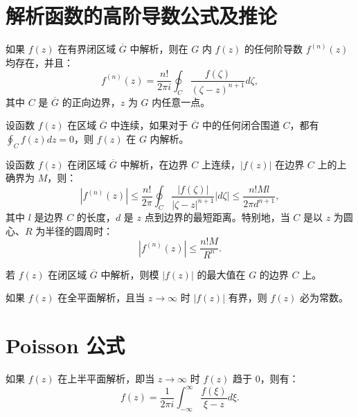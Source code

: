 \section{解析函数的高阶导数公式及推论}

\begin{theorem}[解析函数的高阶导数公式]
如果 \(f(z)\) 在有界闭区域 \(\overline{G}\) 中解析，则在 \(G\) 内 \(f(z)\) 的任何阶导数 \(f^{(n)}(z)\) 均存在，并且：
\[
f^{(n)}(z) = \frac{n!}{2\pi i} \oint_C \frac{f(\zeta)}{(\zeta - z)^{n+1}} d\zeta,
\]
其中 \(C\) 是 \(\overline{G}\) 的正向边界，\(z\) 为 \(G\) 内任意一点。
\end{theorem}

\begin{theorem}[Morera 定理]
设函数 \(f(z)\) 在区域 \(\overline{G}\) 中连续，如果对于 \(\overline{G}\) 中的任何闭合围道 \(C\)，都有 \(\oint_C f(z) dz = 0\)，则 \(f(z)\) 在 \(G\) 内解析。
\end{theorem}

\begin{theorem}
设函数 \(f(z)\) 在闭区域 \(\overline{G}\) 中解析，在边界 \(C\) 上连续，\(|f(z)|\) 在边界 \(C\) 上的上确界为 \(M\)，则：
\[
|f^{(n)}(z)| \le \frac{n!}{2\pi} \oint_C \frac{|f(\zeta)|}{|\zeta - z|^{n+1}} |d\zeta| \le \frac{n! M l}{2\pi d^{n+1}},
\]
其中 \(l\) 是边界 \(C\) 的长度，\(d\) 是 \(z\) 点到边界的最短距离。特别地，当 \(C\) 是以 \(z\) 为圆心、\(R\) 为半径的圆周时：
\[
|f^{(n)}(z)| \le \frac{n!M}{R^n}.
\]
\end{theorem}

\begin{theorem}[最大模原理]
若 \(f(z)\) 在闭区域 \(\overline{G}\) 中解析，则模 \(|f(z)|\) 的最大值在 \(G\) 的边界 \(C\) 上。
\end{theorem}

\begin{theorem}[Liouville 定理]
如果 \(f(z)\) 在全平面解析，且当 \(z \to \infty\) 时 \(|f(z)|\) 有界，则 \(f(z)\) 必为常数。
\end{theorem}



\section{Poisson 公式}

\begin{theorem}
如果 \(f(z)\) 在上半平面解析，即当 \(z \to \infty\) 时 \(f(z)\) 趋于 \(0\)，则有：
\[
f(z) = \frac{1}{2\pi i} \int_{-\infty}^{\infty} \frac{f(\xi)}{\xi - z} d\xi.
\]
\end{theorem}

